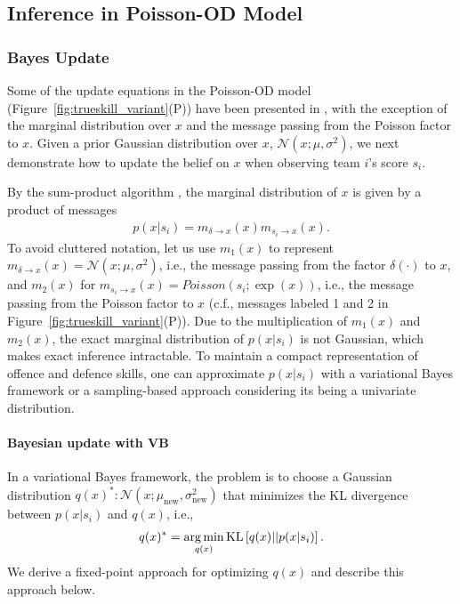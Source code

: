 \subsection{Inference in Poisson-OD Model}
\label{sec:PoissonInference}

\subsubsection{Bayes Update}
Some of the update equations in the Poisson-OD model
(Figure~\ref{fig:trueskill_variant}(P)) have been presented in
\cite{herbrich06569}, with the exception of the marginal distribution
over $x$ and the message passing from the Poisson factor to $x$. Given
a prior Gaussian distribution over $x$, $\mathcal{N}(x;\mu,
\sigma^2)$, we next
demonstrate how to update the belief on $x$ when observing
team $i$'s score $s_i$.

By the sum-product algorithm \cite{kschischang01498}, the
marginal distribution of $x$ is given by a product of messages
\begin{align}\label{eq:marginal}
    p(x|s_i) = m_{\delta \rightarrow x}(x) m_{s_i \rightarrow x}(x).
\end{align}
\unindent To avoid cluttered notation, let us use $m_1(x)$ to represent
$m_{\delta \rightarrow x}(x) = \mathcal{N}(x;\mu,\sigma^2)$, i.e., the message
passing from the factor $\delta(\cdot)$ to $x$, and $m_2(x)$ for
$m_{s_i\rightarrow x}(x) = Poisson(s_i;\exp(x))$, i.e.,
the message passing from the Poisson
factor to $x$ (c.f., messages labeled 1 and 2 in
Figure~\ref{fig:trueskill_variant}(P)). Due to the multiplication of
$m_{1}(x)$ and $m_{2}(x)$, the exact marginal distribution of
$p(x|s_i)$ is not Gaussian, which makes exact inference
intractable. To maintain a compact representation of offence and
defence skills, one can approximate $p(x|s_i)$ with a variational
Bayes framework or a sampling-based approach considering its being a univariate distribution.

\paragraph{\bf Bayesian update with VB}
In a variational Bayes framework, the problem is to choose a Gaussian distribution $q(x)^*:
\mathcal{N}(x;\mu_{\text{new}}, \sigma_{\text{new}}^2)$ that minimizes
the KL divergence between $p(x|s_i)$ and $q(x)$, i.e.,
\begin{align}\label{eq:marginal2}
    q(x)^* = \argmin_{q(x)} \text{KL}\left[q(x)|| p(x|s_i)\right].
\end{align}
We derive a fixed-point approach for optimizing $q(x)$ \cite{Beal:EMFixedPoint02} and describe this approach below.

